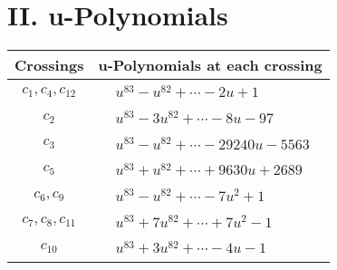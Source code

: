 \documentclass[1p]{elsarticle_modified}
\theoremstyle{definition}
\begin{document}
\newpage\renewcommand{\arraystretch}{1}
\centering \section*{ II. u-Polynomials}
\begin{tabular}{m{50pt}|m{274pt}}
Crossings & \hspace{64pt}u-Polynomials at each crossing \\
\hline $$\begin{aligned}c_{1},c_{4},c_{12}\end{aligned}$$&$\begin{aligned}
&u^{83}- u^{82}+\cdots-2 u+1
\end{aligned}$\\
\hline $$\begin{aligned}c_{2}\end{aligned}$$&$\begin{aligned}
&u^{83}-3 u^{82}+\cdots-8 u-97
\end{aligned}$\\
\hline $$\begin{aligned}c_{3}\end{aligned}$$&$\begin{aligned}
&u^{83}- u^{82}+\cdots-29240 u-5563
\end{aligned}$\\
\hline $$\begin{aligned}c_{5}\end{aligned}$$&$\begin{aligned}
&u^{83}+u^{82}+\cdots+9630 u+2689
\end{aligned}$\\
\hline $$\begin{aligned}c_{6},c_{9}\end{aligned}$$&$\begin{aligned}
&u^{83}- u^{82}+\cdots-7 u^2+1
\end{aligned}$\\
\hline $$\begin{aligned}c_{7},c_{8},c_{11}\end{aligned}$$&$\begin{aligned}
&u^{83}+7 u^{82}+\cdots+7 u^2-1
\end{aligned}$\\
\hline $$\begin{aligned}c_{10}\end{aligned}$$&$\begin{aligned}
&u^{83}+3 u^{82}+\cdots-4 u-1
\end{aligned}$\\
\hline
\end{tabular}\newpage\renewcommand{\arraystretch}{1}
\end{document}
